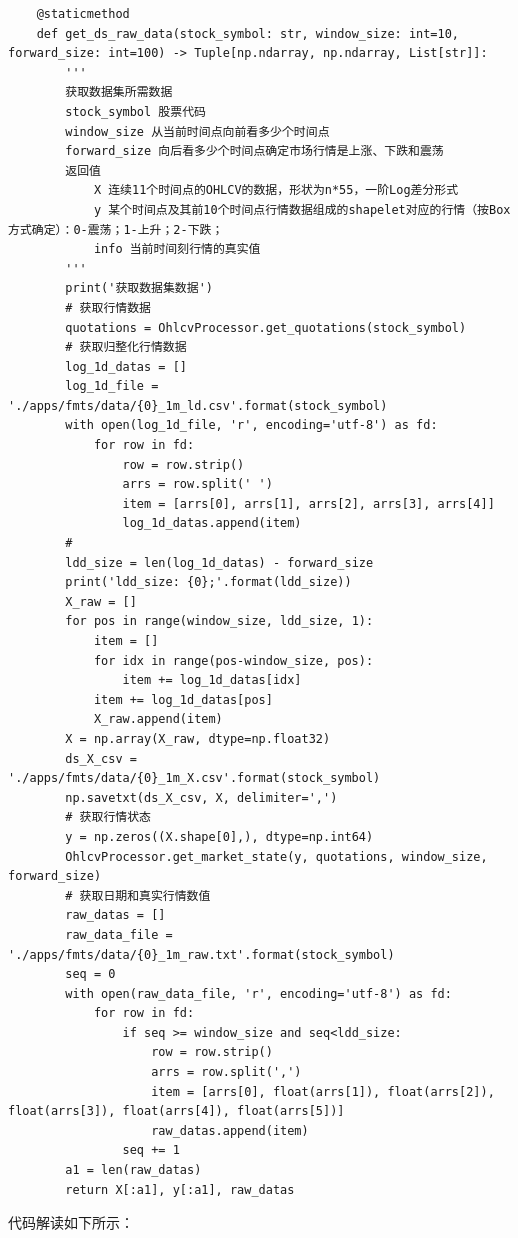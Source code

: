\begin{lstlisting}
    @staticmethod
    def get_ds_raw_data(stock_symbol: str, window_size: int=10, forward_size: int=100) -> Tuple[np.ndarray, np.ndarray, List[str]]:
        '''
        获取数据集所需数据
        stock_symbol 股票代码
        window_size 从当前时间点向前看多少个时间点
        forward_size 向后看多少个时间点确定市场行情是上涨、下跌和震荡
        返回值 
            X 连续11个时间点的OHLCV的数据，形状为n*55，一阶Log差分形式
            y 某个时间点及其前10个时间点行情数据组成的shapelet对应的行情（按Box方式确定）：0-震荡；1-上升；2-下跌；
            info 当前时间刻行情的真实值
        '''
        print('获取数据集数据')
        # 获取行情数据
        quotations = OhlcvProcessor.get_quotations(stock_symbol)
        # 获取归整化行情数据
        log_1d_datas = []
        log_1d_file = './apps/fmts/data/{0}_1m_ld.csv'.format(stock_symbol)
        with open(log_1d_file, 'r', encoding='utf-8') as fd:
            for row in fd:
                row = row.strip()
                arrs = row.split(' ')
                item = [arrs[0], arrs[1], arrs[2], arrs[3], arrs[4]]
                log_1d_datas.append(item)
        # 
        ldd_size = len(log_1d_datas) - forward_size
        print('ldd_size: {0};'.format(ldd_size))
        X_raw = []
        for pos in range(window_size, ldd_size, 1):
            item = []
            for idx in range(pos-window_size, pos):
                item += log_1d_datas[idx]
            item += log_1d_datas[pos]
            X_raw.append(item)
        X = np.array(X_raw, dtype=np.float32)
        ds_X_csv = './apps/fmts/data/{0}_1m_X.csv'.format(stock_symbol)
        np.savetxt(ds_X_csv, X, delimiter=',')
        # 获取行情状态
        y = np.zeros((X.shape[0],), dtype=np.int64)
        OhlcvProcessor.get_market_state(y, quotations, window_size, forward_size)
        # 获取日期和真实行情数值
        raw_datas = []
        raw_data_file = './apps/fmts/data/{0}_1m_raw.txt'.format(stock_symbol)
        seq = 0
        with open(raw_data_file, 'r', encoding='utf-8') as fd:
            for row in fd:
                if seq >= window_size and seq<ldd_size:
                    row = row.strip()
                    arrs = row.split(',')
                    item = [arrs[0], float(arrs[1]), float(arrs[2]), float(arrs[3]), float(arrs[4]), float(arrs[5])]
                    raw_datas.append(item)
                seq += 1
        a1 = len(raw_datas)
        return X[:a1], y[:a1], raw_datas
\end{lstlisting}
代码解读如下所示：
